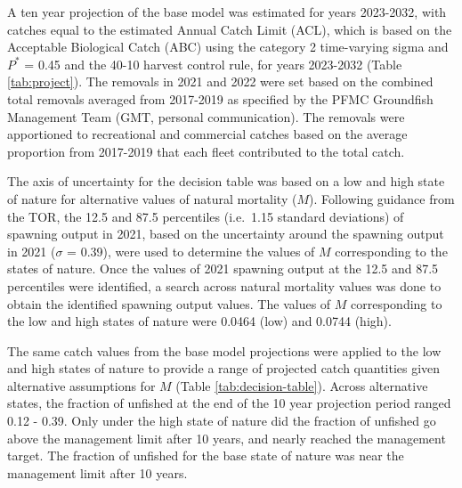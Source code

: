 \documentclass[11pt,
  english,
  letterpaper,
]{article}
\begin{document}
\leavevmode\tagmcend\tagstructend


A ten year projection of the base model was estimated for years 2023-2032, with catches equal to the estimated Annual Catch Limit (ACL), which is based on the Acceptable Biological Catch (ABC) using the category 2 time-varying sigma and {\(P^*\)\leavevmode\tagmcend\tagstructend} = 0.45 and the 40-10 harvest control rule, for years 2023-2032 (Table \ref{tab:project}). The removals in 2021 and 2022 were set based on the combined total removals averaged from 2017-2019 as specified by the PFMC Groundfish Management Team (GMT, personal communication). The removals were apportioned to recreational and commercial catches based on the average proportion from 2017-2019 that each fleet contributed to the total catch.

\leavevmode\tagmcend\tagstructend\par


The axis of uncertainty for the decision table was based on a low and high state of nature for alternative values of natural mortality ({\(M\)\leavevmode\tagmcend\tagstructend}). Following guidance from the TOR, the 12.5 and 87.5 percentiles (i.e.~1.15 standard deviations) of spawning output in 2021, based on the uncertainty around the spawning output in 2021 ({\(\sigma\)\leavevmode\tagmcend\tagstructend} = 0.39), were used to determine the values of {\(M\)\leavevmode\tagmcend\tagstructend} corresponding to the states of nature. Once the values of 2021 spawning output at the 12.5 and 87.5 percentiles were identified, a search across natural mortality values was done to obtain the identified spawning output values. The values of {\(M\)\leavevmode\tagmcend\tagstructend} corresponding to the low and high states of nature were 0.0464 (low) and 0.0744 (high).

\leavevmode\tagmcend\tagstructend\par


The same catch values from the base model projections were applied to the low and high states of nature to provide a range of projected catch quantities given alternative assumptions for {\(M\)\leavevmode\tagmcend\tagstructend} (Table \ref{tab:decision-table}). Across alternative states, the fraction of unfished at the end of the 10 year projection period ranged 0.12 - 0.39. Only under the high state of nature did the fraction of unfished go above the management limit after 10 years, and nearly reached the management target. The fraction of unfished for the base state of nature was near the management limit after 10 years.
\end{document}
